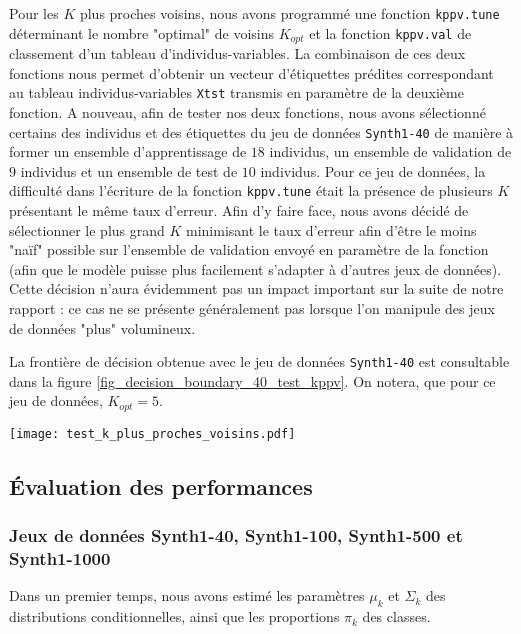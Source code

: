 \documentclass{article}
\begin{document}
\begin{multicols}{2}
Pour les $K$ plus proches voisins, nous avons programmé une fonction \texttt{kppv.tune} déterminant le nombre "optimal" de voisins $K_{opt}$ et la fonction \texttt{kppv.val} de classement d'un tableau d'individus-variables. La combinaison de ces deux fonctions nous permet d'obtenir un vecteur d'étiquettes prédites correspondant au tableau individus-variables \texttt{Xtst} transmis en paramètre de la deuxième fonction. A nouveau, afin de tester nos deux fonctions, nous avons sélectionné certains des individus et des étiquettes du jeu de données \texttt{Synth1-40} de manière à former un ensemble d'apprentissage de $18$ individus, un ensemble de validation de $9$ individus et un ensemble de test de $10$ individus. Pour ce jeu de données, la difficulté dans l'écriture de la fonction \texttt{kppv.tune} était la présence de plusieurs $K$ présentant le même taux d'erreur. Afin d'y faire face, nous avons décidé de sélectionner le plus grand $K$ minimisant le taux d'erreur afin d'être le moins "naïf" possible sur l'ensemble de validation envoyé en paramètre de la fonction (afin que le modèle puisse plus facilement s'adapter à d'autres jeux de données). Cette décision n'aura évidemment pas un impact important sur la suite de notre rapport : ce cas ne se présente généralement pas lorsque l'on manipule des jeux de données "plus" volumineux. 

La frontière de décision obtenue avec le jeu de données \texttt{Synth1-40} est consultable dans la figure \ref{fig_decision_boundary_40_test_kppv}. On notera, que pour ce jeu de données, $K_{opt} = 5$.

\begingroup
   \centering
   \texttt{[image: test\_k\_plus\_proches\_voisins.pdf]}
    \label{fig_decision_boundary_40_test_kppv}
\endgroup

\subsection{Évaluation des performances}
\label{subsec_evaluation_performances}

\subsubsection{Jeux de données Synth1-40, Synth1-100, Synth1-500 et Synth1-1000}
\label{subsubsec_dataset_1}

Dans un premier temps, nous avons estimé les paramètres $\mu_k$ et $\Sigma_k$ des distributions conditionnelles, ainsi que les proportions $\pi_k$ des classes.


\end{multicols}
\end{document}
